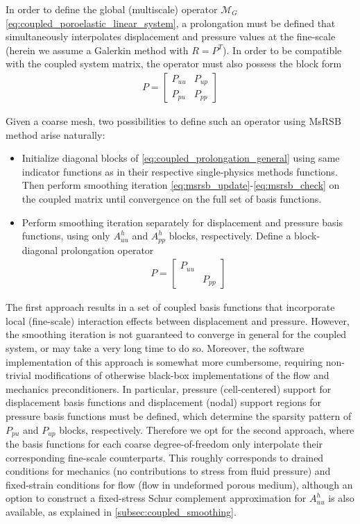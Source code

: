 In order to define the global (multiscale) operator $\mathcal{M}_G$ \eqref{eq:coupled_poroelastic_linear_system}, a prolongation must be defined that simultaneously interpolates displacement and pressure values at the fine-scale (herein we assume a Galerkin method with $R = P^T$).   In order to be compatible with the coupled system matrix, the operator must also possess the block form
\begin{align}
    P = 
    \begin{bmatrix}
        P_{uu} & P_{up} \\
        P_{pu} & P_{pp}
    \end{bmatrix}
    \label{eq:coupled_prolongation_general}
\end{align}

Given a coarse mesh, two possibilities to define such an operator using MsRSB method arise naturally:
\begin{itemize}
    \item Initialize diagonal blocks of \eqref{eq:coupled_prolongation_general} using same indicator functions as in their respective single-physics methods functions.   Then perform smoothing iteration \eqref{eq:msrsb_update}-\eqref{eq:msrsb_check} on the coupled matrix until convergence on the full set of basis functions.
    \item Perform smoothing iteration separately for displacement and pressure basis functions, using only $A_{uu}^h$ and $A_{pp}^h$ blocks, respectively.   Define a block-diagonal prolongation operator
    \begin{align}
        P = 
    \begin{bmatrix}
    P_{uu} &        \\
           & P_{pp}
    \end{bmatrix}
    \label{eq:coupled_prolongation}
    \end{align}
\end{itemize}

The first approach results in a set of coupled basis functions that incorporate local (fine-scale) interaction effects between displacement and pressure.   However, the smoothing iteration is not guaranteed to converge in general for the coupled system, or may take a very long time to do so.   Moreover, the software implementation of this approach is somewhat more cumbersome, requiring non-trivial modifications of otherwise black-box implementations of the flow and mechanics preconditioners.   In particular, pressure (cell-centered) support for displacement basis functions and displacement (nodal) support regions for pressure basis functions must be defined, which determine the sparsity pattern of $P_{pu}$ and $P_{up}$ blocks, respectively.   Therefore we opt for the second approach, where the basis functions for each coarse degree-of-freedom only interpolate their corresponding fine-scale counterparts.   This roughly corresponds to drained conditions for mechanics (no contributions to stress from fluid pressure) and fixed-strain conditions for flow (flow in undeformed porous medium), although an option to construct a fixed-stress Schur complement approximation for $A_{uu}^h$ is also available, as explained in \autoref{subsec:coupled_smoothing}.

